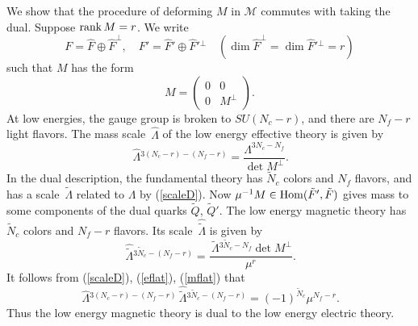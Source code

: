 \documentclass[lecture]{qft-l}
\newcommand{\Lam}{\varLambda}
\newcommand{\rank}{{\rm rank\,}}
\newcommand{\MM}{{\mathcal M}}
\newcommand{\four}[4]{\left(	\begin{array}{cc}
				{#1}	&	{#2}	\\
				{#3}	&	{#4}
				\end{array}   \right)}
\newcommand{\Hom}{{\rm Hom}}
\newcommand{\FT}{F'}%
\newcommand{\ND}{\tilde{N}_c}
\newcommand{\FD}{\tilde{F}}
\newcommand{\QD}{\tilde{Q}}
\newcommand{\FDT}{\tilde{F}'}
\newcommand{\QDT}{\tilde{Q}'}
\newcommand{\FTh}{\hat{F}'}
\newcommand{\Lamh}{\,\hat{\!\Lam}{}}
\newcommand{\LamD}{\,\tilde{\!\Lam}{}}
\newcommand{\LamDh}{\,\hat{\tilde{\!\Lam}}{}}
\numberwithin{figure}{chapter}
\begin{document}
We show that the procedure of deforming $M$ in $\MM$ commutes with taking
the dual.
Suppose $\rank M=r$.
We write
	\begin{equation}\label{decomp}
F=\hat{F}\oplus\hat{F}^\perp,\quad\FT=\FTh\oplus\FTh{^{\perp}}\quad
(\dim\hat{F}^\perp=\dim\FTh{^{\perp}}=r)
	\end{equation}
such that $M$ has the form
\begin{equation}
M=\four{0}{0}{0}{M^\perp}.	
	\end{equation}
At low energies, the gauge group is broken to $SU(N_c-r)$,
and there are $N_f-r$ light flavors.
The mass scale $\Lamh$ of the low energy effective theory is given by
	\begin{equation}\label{eflat}
\Lamh^{3(N_c-r)-(N_f-r)}=\frac{\Lam^{3N_c-N_f}}{\det M^\perp}.
	\end{equation}
In the dual description, the fundamental theory has $\ND$ colors and $N_f$
flavors, and has a scale $\LamD$ related to $\Lam$ by (\ref{scaleD}).
Now $\mu^{-1}M\in\Hom(\FDT,\FD)$ gives mass to some components of
the dual quarks $\QD$, $\QDT$.
The low energy magnetic theory has $\ND$ colors and $N_f-r$ flavors.
Its scale $\LamDh$ is given by
	\begin{equation}\label{mflat}
\LamDh^{3\ND-(N_f-r)}=\frac{\LamD^{3\ND-N_f}\det M^\perp}{\mu^r}.
	\end{equation}
It follows from (\ref{scaleD}), (\ref{eflat}), (\ref{mflat}) that
	\begin{equation}
\Lamh^{3(N_c-r)-(N_f-r)}\LamDh^{3\ND-(N_f-r)}=(-1)^{\ND}\mu^{N_f-r}.
	\end{equation}
Thus the low energy magnetic theory is dual to the low energy electric theory.
\end{document}
